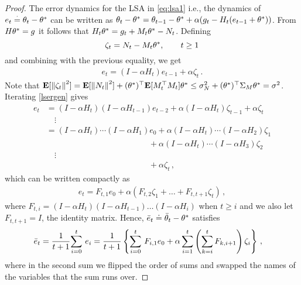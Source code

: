 \begin{proof}
The error dynamics for the LSA in \eqref{eq:lsa1} i.e., the dynamics of $e_t\eqdef\theta_t-\ts$ can be written as 
$\theta_t-\ts=\theta_{t-1}-\ts+\alpha(g_t -H_t(e_{t-1}+\ts))$.
From $H\ts=g$ it follows that $H_t\theta^* = g_t + M_t\ts - N_t$. Defining 
\[
\zeta_t = N_t - M_t \ts, \qquad t\ge 1
\] 
and combining with the previous equality, we get
\begin{align}\label{lsergen}
e_t=(I-\alpha H_t)e_{t-1}+\alpha \zeta_t\,.
\end{align}
Note that 
$
\EE{ \norm{\zeta_t}^2 } 
= \EE{ \norm{N_t}^2 } + (\ts)^\top \EE{ M_t^\top M_t }\ts \le \sigma_N^2 + (\ts)^\top \Sigma_M \ts 
= \sigma^2
$.
Iterating \eqref{lsergen}  gives
\begin{align*}
e_t 
& = (I-\alpha H_t) (I-\alpha H_{t-1}) e_{t-2} + \alpha (I-\alpha H_t) \zeta_{t-1} +\alpha \zeta_t \\
& \quad \vdots\\
& = (I-\alpha H_t) \cdots (I-\alpha H_1) e_0 + \alpha (I-\alpha H_t) \cdots (I-\alpha H_2) \zeta_1 \\
&  \qquad \qquad\qquad \qquad\qquad \qquad\,\,\, + \alpha (I-\alpha H_t) \cdots (I-\alpha H_3) \zeta_2\\
&  \quad \vdots \\
& \qquad \qquad\qquad \qquad\qquad \qquad\,\,\, + \alpha \zeta_t\,,
\end{align*}
which can be written compactly as
\begin{align}
\label{eq:etft}
e_t = F_{t,1} e_0 + \alpha (F_{t,2} \zeta_1 + \dots + F_{t,t+1} \zeta_t )\,,
\end{align}
where $F_{t,i} = (I-\alpha H_t) (I-\alpha H_{t-1}) \dots (I-\alpha H_i)$ when $t\ge i$ and we also let $F_{t,t+1}=I$, the identity matrix.
Hence, $\eb_t \doteq \tb_t-\ts$ satisfies
\begin{align*}
\eb_t&=\frac{1}{t+1}\ous{\sum}{i=0}{t}e_i
=\frac{1}{t+1}\left\{\ous{\sum}{i=0}{t} F_{i,1} e_0+ \alpha \sum_{i=1}^{t} \left(\sum_{k=i}^{t} F_{k,i+1} \right)\zeta_i   \right\}\,,
\end{align*}
where in the second sum we flipped the order of sums and swapped the names of the variables that the sum runs over.


\end{proof}
